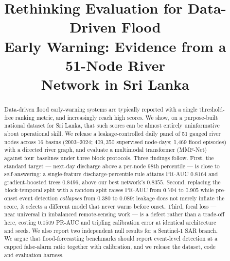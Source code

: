 \documentclass[conference]{IEEEtran}
\begin{document}
\title{Rethinking Evaluation for Data-Driven Flood\\Early Warning: Evidence from a
51-Node River\\Network in Sri Lanka}

\author{
}

\maketitle

\begin{abstract}
Data-driven flood early-warning systems are typically reported with a single
threshold-free ranking metric, and increasingly reach high scores. We show, on a
purpose-built national dataset for Sri Lanka, that such scores can be almost
entirely uninformative about operational skill. We release a leakage-controlled
daily panel of 51 gauged river nodes across 16 basins (2003--2024;
$409{,}350$ supervised node-days; 1{,}469 flood episodes) with a directed river
graph, and evaluate a multimodal transformer (MMF-Net) against four baselines
under three block protocols. Three findings follow. First, the standard target
--- next-day discharge above a per-node 98th percentile --- is close to
self-answering: a single-feature discharge-percentile rule attains PR-AUC
$0.8164$ and gradient-boosted trees $0.8496$, above our best network's $0.8355$.
Second, replacing the block-temporal split with a random split raises PR-AUC from
$0.704$ to $0.905$ while pre-onset event detection \emph{collapses} from
$0.380$ to $0.089$: leakage does not merely inflate the score, it selects a
different model that never warns before onset. Third, focal loss --- near
universal in imbalanced remote-sensing work --- is a defect rather than a
trade-off here, costing $0.0509$ PR-AUC and tripling calibration error at
identical architecture and seeds. We also report two independent null results for
a Sentinel-1 SAR branch. We argue that flood-forecasting benchmarks should report
event-level detection at a capped false-alarm ratio together with calibration,
and we release the dataset, code and evaluation harness.
\end{abstract}
\end{document}

